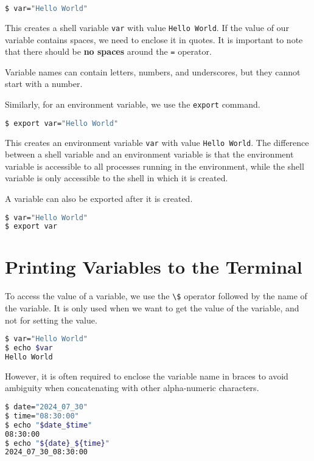 \begin{lstlisting}[language=bash]
$ var="Hello World"
\end{lstlisting}

This creates a shell variable \lstinline{var} with value \lstinline{Hello World}.
If the value of our variable contains spaces, we need to enclose it in quotes.
It is important to note that there should be \textbf{no spaces} around the \lstinline{=} operator.

Variable names can contain letters, numbers, and underscores, but they cannot start with a number.

Similarly, for an environment variable, we use the \lstinline{export} command.

\begin{lstlisting}[language=bash]
$ export var="Hello World"
\end{lstlisting}

This creates an environment variable \lstinline{var} with value \lstinline{Hello World}.
The difference between a shell variable and an environment variable is that the environment variable is accessible to all processes running in the environment, while the shell variable is only accessible to the shell in which it is created.

A variable can also be exported after it is created.

\begin{lstlisting}[language=bash]
$ var="Hello World"
$ export var
\end{lstlisting}

\section{Printing Variables to the Terminal}

To access the value of a variable, we use the \lstinline{\$} operator followed by the name of the variable.
It is only used when we want to get the value of the variable, and not for setting the value.

\begin{lstlisting}[language=bash]
$ var="Hello World"
$ echo $var
Hello World
\end{lstlisting}

However, it is often required to enclose the variable name in braces to avoid ambiguity when concatenating with other alpha-numeric characters.

\begin{lstlisting}[language=bash]
$ date="2024_07_30"
$ time="08:30:00"
$ echo "$date_$time"
08:30:00
$ echo "${date}_${time}"
2024_07_30_08:30:00
\end{lstlisting}

